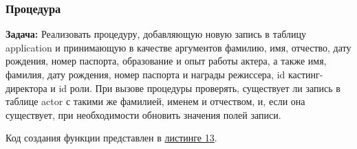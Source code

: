 \documentclass[11pt,a4paper,final]{article} %
\begin{document}
\subsubsection{Процедура}

\textbf{Задача:} Реализовать процедуру, добавляющую новую запись в таблицу application и принимающую в качестве аргументов фамилию, имя, отчество, дату рождения, номер паспорта, образование и опыт работы актера, а также имя, фамилия, дату рождения, номер паспорта и награды режиссера, id кастинг-директора и id роли. При вызове процедуры проверять, существует ли запись в таблице actor с такими же фамилией, именем и отчеством, и, если она существует, при необходимости обновить значения полей записи.  

Код создания функции представлен в \hyperref[lst:l13]{листинге 13}.
\end{document}
